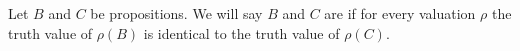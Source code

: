 \begin{node}[Definition]\label{prop-0006}%
Let $B$ and $C$ be propositions. We will say $B$ and $C$ are
 if for every valuation $\rho$ the
truth value of $\rho(B)$ is identical to the truth value of $\rho(C)$.
\end{node}
